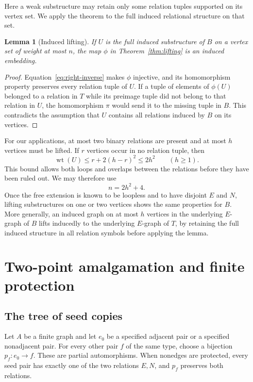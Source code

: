 \documentclass[11pt,reqno]{amsart}
\newtheorem{lemma}[theorem]{Lemma}
\theoremstyle{definition}
\theoremstyle{remark}
\newcommand{\wt}{\operatorname{wt}}
\begin{document}
Here a weak substructure may retain only some relation tuples supported on its vertex set. We apply the theorem to the full induced relational structure on that set.

\begin{lemma}[Induced lifting]\label{lem:induced-lifting}
If $U$ is the full induced substructure of $B$ on a vertex set of weight at most $n$, the map $\phi$ in Theorem~\ref{thm:lifting} is an induced embedding.
\end{lemma}
\begin{proof}
Equation~\eqref{eq:right-inverse} makes $\phi$ injective, and its homomorphism property preserves every relation tuple of $U$. If a tuple of elements of $\phi(U)$ belonged to a relation in $T$ while its preimage tuple did not belong to that relation in $U$, the homomorphism $\pi$ would send it to the missing tuple in $B$. This contradicts the assumption that $U$ contains all relations induced by $B$ on its vertices.
\end{proof}

For our applications, at most two binary relations are present and at most $h$ vertices must be lifted. If $r$ vertices occur in no relation tuple, then
\[
 \wt(U)\le r+2(h-r)^2\le 2h^2\qquad(h\ge1).
\]
This bound allows both loops and overlaps between the relations before they have been ruled out. We may therefore use
\begin{equation}\label{eq:weight-bound}
 n=2h^2+4.
\end{equation}
Once the free extension is known to be loopless and to have disjoint $E$ and $N$, lifting substructures on one or two vertices shows the same properties for $B$. More generally, an induced graph on at most $h$ vertices in the underlying $E$-graph of $B$ lifts inducedly to the underlying $E$-graph of $T$, by retaining the full induced structure in all relation symbols before applying the lemma.

\section{Two-point amalgamation and finite protection}\label{sec:criteria}

\subsection{The tree of seed copies}

Let $A$ be a finite graph and let $e_0$ be a specified adjacent pair or a specified nonadjacent pair. For every other pair $f$ of the same type, choose a bijection $p_f:e_0\to f$. These are partial automorphisms. When nonedges are protected, every seed pair has exactly one of the two relations $E,N$, and $p_f$ preserves both relations.
\end{document}
